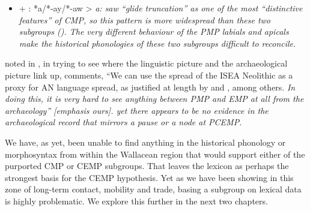 \begin{itemize}
				was proposed to belong (see \citealp[141ff]{Collins1986}).
				Having been displaced from its traditional lands for four centuries
				surely complicates the picture.
				There is no agreement among investigators as to how  should be classified.
	\item	{} + : *a/*-ay/*-aw
				> \it{a}: \citet[264--266]{Blust1993} saw “glide truncation” as one
				of the most “distinctive features” of CMP,
				so this pattern is more widespread than these two subgroups ().
				The very different behaviour of the PMP labials
				and apicals make the historical phonologies of these two subgroups difficult to reconcile.
\end{itemize}

 noted in ,
in trying to see where the linguistic picture
and the archaeological picture link up,
\citet[511]{Spriggs2011} comments, “We can use the spread of
the ISEA Neolithic as a proxy for AN language spread,
as justified at length by \citet{Pawley2004}
and \citet{Ross2008}, among others.
\it{In doing this, it is very hard to see anything between PMP
and EMP at all from the archaeology}” [emphasis ours].
 yet there appears to be no evidence in the archaeological
record that mirrors a pause or a node at PCEMP.

We have, as yet,
been unable to find anything in the historical phonology or morphosyntax
from within the Wallacean region that would support either of
the purported CMP or CEMP subgroups.
That leaves the lexicon as perhaps the strongest basis for the CEMP hypothesis.
Yet as we have been showing in this zone of long-term contact,
mobility and trade, basing a subgroup on lexical data is highly problematic.
We explore this further in the next two chapters.